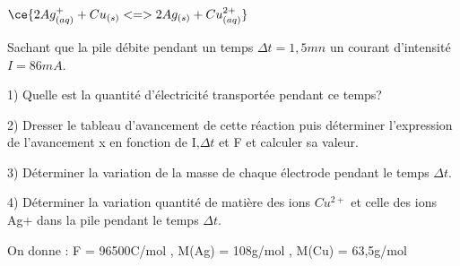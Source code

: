 \documentclass[12pt]{article}
\begin{document}
$\ce{2Ag^+_{(aq)} + Cu_{(s)} <=> 2Ag_{(s)} + Cu^{2+}_{(aq)}}$

Sachant que la pile débite pendant un temps $\Delta{t} = 1,5mn$
un courant d'intensité $I=86mA$.

1) Quelle est la quantité d'électricité transportée pendant ce temps?

2) Dresser le tableau d'avancement de cette réaction puis déterminer l'expression de l'avancement x en fonction de I,$\Delta{t}$ et F et  calculer sa valeur.

3) Déterminer la variation de la masse de chaque électrode pendant le temps $\Delta{t}$.

4) Déterminer la variation quantité de matière des ions $Cu^{2+}$ et celle des ions Ag+ dans la pile pendant le temps $\Delta{t}$.

On donne : F = 96500C/mol , M(Ag) = 108g/mol , M(Cu) = 63,5g/mol






\end{document}
